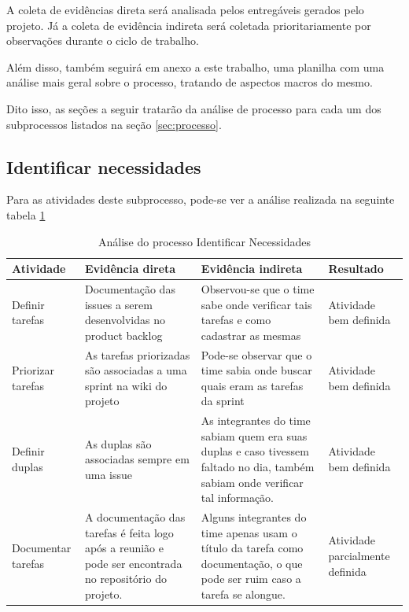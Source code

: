 \documentclass[a4paper, 11pt]{article}
\begin{document}
A coleta de evidências direta será analisada pelos entregáveis gerados pelo
projeto. Já a coleta de evidência indireta será coletada prioritariamente por
observações durante o ciclo de trabalho.

Além disso, também seguirá em anexo a este trabalho, uma planilha com uma
análise mais geral sobre o processo, tratando de aspectos macros do mesmo.

Dito isso, as seções a seguir tratarão da análise de processo para cada um dos
subprocessos listados na seção \ref{sec:processo}.

\subsection*{Identificar necessidades}

Para as atividades deste subprocesso, pode-se ver a análise realizada na
seguinte tabela \ref{tab:necessidades}

\begin{table}[]
\centering
\caption{Análise do processo Identificar Necessidades}
\label{tab:necessidades}
\begin{tabularx}{\textwidth}{|X|X|X|X|}
\hline
Atividade & Evidência direta & Evidência indireta & Resultado \\ \hline
\multicolumn{1}{|l|}{Definir tarefas} & Documentação das issues a serem desenvolvidas no product backlog & Observou-se que o time sabe onde verificar tais tarefas e como cadastrar as mesmas & Atividade bem definida \\ \hline
\multicolumn{1}{|l|}{Priorizar tarefas} & As tarefas priorizadas são associadas a uma sprint na wiki do projeto & Pode-se observar que o time sabia onde buscar quais eram as tarefas da sprint & Atividade bem definida \\ \hline
\multicolumn{1}{|l|}{Definir duplas} & As duplas são associadas sempre em uma issue & As integrantes do time sabiam quem era suas duplas e caso tivessem faltado no dia, também sabiam onde verificar tal informação. & Atividade bem definida \\ \hline
\multicolumn{1}{|l|}{Documentar tarefas} & A documentação das tarefas é feita logo após a reunião e pode ser encontrada no repositório do projeto. & Alguns integrantes do time apenas usam o título da tarefa como documentação, o que pode ser ruim caso a tarefa se alongue. & Atividade parcialmente definida \\ \hline
\end{tabularx}
\end{table}
\end{document}
